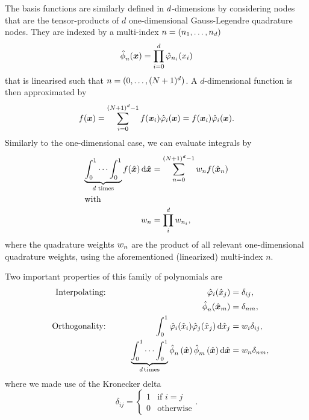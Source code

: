 The basis functions are similarly defined in $\dimensions$-dimensions by considering nodes that are the tensor-products of $d$ one-dimensional Gauss-Legendre quadrature nodes.
They are indexed by a multi-index $n = (n_1, \ldots, n_\dimensions)$
\begin{equation}
  \label{eq:basis-space}
  \sbasisRef[][n] (\bm{x}) = \prod_{i=0}^{\dimensions} \lagrangeRef[n_i] (x_i)
\end{equation}
that is linearised such that $n = (0, \ldots, \sbasisSize)$.
A $d$-dimensional function is then approximated by
\begin{equation}
  \label{eq:lagrange-expansion}
  f(\bm{x}) = \sum_{i = 0}^{\sbasisSize - 1} f(\bm{x}_i) \lagrangeRef[i](\bm{x}) = f(\bm{x}_i) \lagrangeRef[i](\bm{x}).
\end{equation}
Similarly to the one-dimensional case, we can evaluate integrals by
\begin{align}
  \label{eq:quadrature}
  \underbrace{\int_0^1 \cdots \int_0^1}_{\dimensions \text{ times}} f(\hat{\bm{x}}) \dd{\hat{\bm{x}}} &=
 \sum_{n=0}^{\sbasisSize-1} \quadWeight[n] f(\quadNodeNd[n]) \\
  \intertext{with}
  \quadWeight[n] &= \prod_{i}^{d} \quadWeight[n_i],
\end{align}
where the quadrature weights $\quadWeight[n]$ are the product of all relevant one-dimensional quadrature weights, using the aforementioned (linearized) multi-index $n$.

Two important properties of this family of polynomials are
  \begin{alignat}{10}
    \label{eq:basis-interpolating}
&& \text{Interpolating:} \qquad && \lagrangeRef[i] (\quadNode[j]) &= \delta_{ij},\\
&& \qquad && \sbasisRef[][n] (\quadNodeNd[m]) &= \delta_{nm}, \notag\\
\label{eq:basis-orthogonality}
&& \text{Orthogonality:} \qquad && \int_0^1 \lagrangeRef[i](\quadNode[i]) \lagrangeRef[j](\quadNode[j]) \dd{\quadNode[j]} &= \quadWeight[i] \delta_{ij},\\
&& \qquad &&
\underbrace{\int_0^1 \cdots \int_0^1}_{d \,\text{times}}
\sbasisRef[][n] \left( \hat{\bm{x}} \right)
\sbasisRef[][m] \left( \hat{\bm{x}} \right) \dd{\hat{\bm{x}}}
&= \quadWeight[n] \delta_{nm}, \notag
    \end{alignat}
    where we made use of the Kronecker delta
\begin{equation}
      \label{eq:kronecker-delta}
      \delta_{ij} =
      \begin{cases}
        1 & \text{if } i = j\\
        0 & \text{otherwise}
      \end{cases}.
\end{equation}

